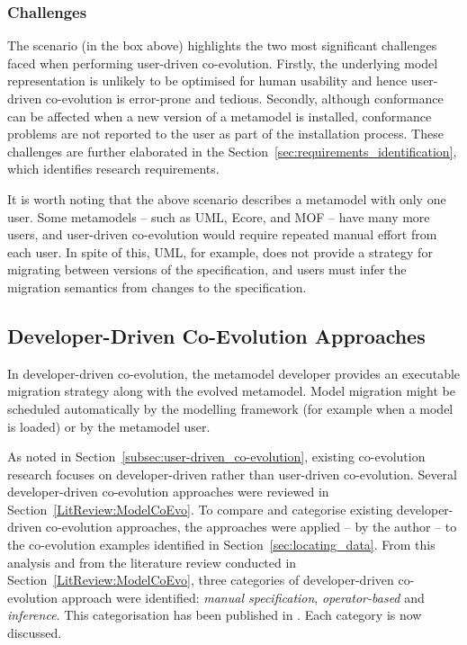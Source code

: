 \subsubsection{Challenges}
The scenario (in the box above) highlights the two most significant challenges faced when performing user-driven co-evolution. Firstly, the underlying model representation is unlikely to be optimised for human usability and hence user-driven co-evolution is error-prone and tedious. Secondly, although conformance can be affected when a new version of a metamodel is installed, conformance problems are not reported to the user as part of the installation process. These challenges are further elaborated in the Section~\ref{sec:requirements_identification}, which identifies research requirements.

It is worth noting that the above scenario describes a metamodel with only one user. Some metamodels -- such as UML, Ecore, and MOF -- have many more users, and user-driven co-evolution would require repeated manual effort from each user. In spite of this, UML, for example, does not provide a strategy for migrating between versions of the specification, and users must infer the migration semantics from changes to the specification.

\subsection{Developer-Driven Co-Evolution Approaches}
\label{subsec:co-evolution_categorisation}
In developer-driven co-evolution, the metamodel developer provides an executable migration strategy along with the evolved metamodel. Model migration might be scheduled automatically by the modelling framework (for example when a model is loaded) or by the metamodel user.

As noted in Section~\ref{subsec:user-driven_co-evolution}, existing co-evolution research focuses on developer-driven rather than user-driven co-evolution. Several developer-driven co-evolution approaches were reviewed in Section~\ref{LitReview:ModelCoEvo}. To compare and categorise existing developer-driven co-evolution approaches, the approaches were applied -- by the author -- to the co-evolution examples identified in Section~\ref{sec:locating_data}. From this analysis and from the literature review conducted in Section~\ref{LitReview:ModelCoEvo}, three categories of developer-driven co-evolution approach were identified: \emph{manual specification}, \emph{operator-based} and \emph{inference}. This categorisation has been published in \cite{rose09analysis}. Each category is now discussed.

